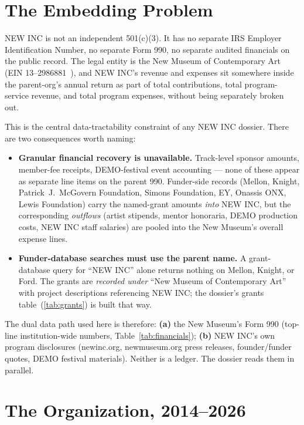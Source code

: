 \documentclass[10pt,letterpaper,twocolumn]{article}
\begin{document}
\section{The Embedding Problem}\label{sec:embedding}

NEW INC is not an independent 501(c)(3). It has no separate IRS Employer Identification Number, no separate Form 990, no separate audited financials on the public record. The legal entity is the New Museum of Contemporary Art (EIN 13--2986881~\citep{propublica2026newmuseum}), and NEW INC's revenue and expenses sit somewhere inside the parent-org's annual return as part of total contributions, total program-service revenue, and total program expenses, without being separately broken out.

This is the central data-tractability constraint of any NEW INC dossier. There are two consequences worth naming:

\begin{itemize}
  \item \textbf{Granular financial recovery is unavailable.} Track-level sponsor amounts, member-fee receipts, DEMO-festival event accounting --- none of these appear as separate line items on the parent 990. Funder-side records (Mellon, Knight, Patrick~J.~McGovern Foundation, Simons Foundation, EY, Onassis ONX, Lewis Foundation) carry the named-grant amounts \emph{into} NEW INC, but the corresponding \emph{outflows} (artist stipends, mentor honoraria, DEMO production costs, NEW INC staff salaries) are pooled into the New Museum's overall expense lines.
  \item \textbf{Funder-database searches must use the parent name.} A grant-database query for ``NEW INC'' alone returns nothing on Mellon, Knight, or Ford. The grants are \emph{recorded under} ``New Museum of Contemporary Art'' with project descriptions referencing NEW INC; the dossier's grants table~(\ref{tab:grants}) is built that way.
\end{itemize}

The dual data path used here is therefore: \textbf{(a)} the New Museum's Form 990 (top-line institution-wide numbers, Table~\ref{tab:financials}); \textbf{(b)} NEW INC's own program disclosures (newinc.org, newmuseum.org press releases, founder/funder quotes, DEMO festival materials). Neither is a ledger. The dossier reads them in parallel.

\section{The Organization, 2014--2026}
\end{document}
